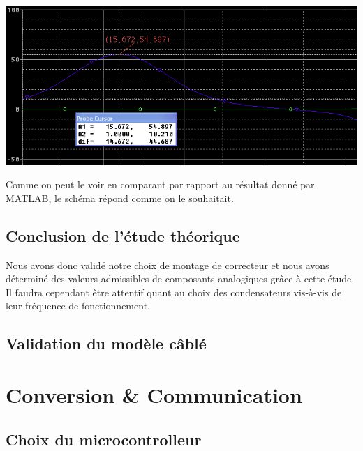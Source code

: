 \documentclass[11pt, french]{article} %
\begin{document}
\begin{center}
\includegraphics[scale = 0.8]{SolutionAnalogique/simuAvph.png} 
\end{center}

Comme on peut le voir en comparant par rapport au résultat donné par MATLAB, le schéma répond comme on le souhaitait. 

\vspace{0.5cm}
\subsection{Conclusion de l'étude théorique}

\noindent
Nous avons donc validé notre choix de montage de correcteur et nous avons déterminé des valeurs admissibles de composants analogiques grâce à cette étude. Il faudra cependant être attentif quant au choix des condensateurs vis-à-vis de leur fréquence de fonctionnement.  

\subsection{Validation du modèle câblé}


\section{Conversion \& Communication}
\subsection{Choix du microcontrolleur}
\end{document}
